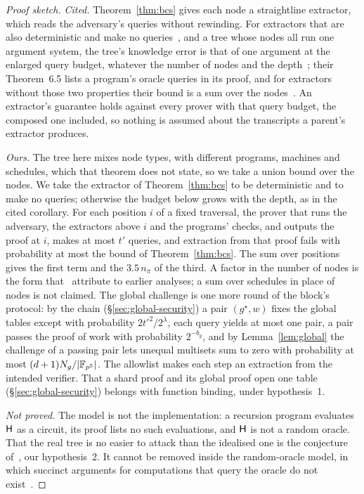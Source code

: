 \begin{proof}[Proof sketch]
\emph{Cited.} Theorem~\ref{thm:bcs} gives each node a straightline extractor, which reads the adversary's queries without rewinding. For extractors that are also deterministic and make no queries~\citep[Def.~3.6]{cgsy24}, and a tree whose nodes all run one argument system, the tree's knowledge error is that of one argument at the enlarged query budget, whatever the number of nodes and the depth~\citep[Thm.~5.1, Rem.~5.2]{cgsy24}; their Theorem~6.5 lists a program's oracle queries in its proof, and for extractors without those two properties their bound is a sum over the nodes~\citep[Cor.~7.8]{cgsy24}. An extractor's guarantee holds against every prover with that query budget, the composed one included, so nothing is assumed about the transcripts a parent's extractor produces.

\emph{Ours.} The tree here mixes node types, with different programs, machines and schedules, which that theorem does not state, so we take a union bound over the nodes. We take the extractor of Theorem~\ref{thm:bcs} to be deterministic and to make no queries; otherwise the budget below grows with the depth, as in the cited corollary. For each position $i$ of a fixed traversal, the prover that runs the adversary, the extractors above $i$ and the programs' checks, and outputs the proof at $i$, makes at most $t'$ queries, and extraction from that proof fails with probability at most the bound of Theorem~\ref{thm:bcs}. The sum over positions gives the first term and the $3.5\,n_\pi$ of the third. A factor in the number of nodes is the form that~\citep{cgsy24} attribute to earlier analyses; a sum over schedules in place of nodes is not claimed. The global challenge is one more round of the block's protocol: by the chain (\S\ref{sec:global-security}) a pair $(g^\star, w)$ fixes the global tables except with probability $2t'^2/2^{\lambda}$, each query yields at most one pair, a pair passes the proof of work with probability $2^{-b_g}$, and by Lemma~\ref{lem:global} the challenge of a passing pair lets unequal multisets sum to zero with probability at most $(d+1)N_g/|\mathbb{F}_{p^5}|$. The allowlist makes each step an extraction from the intended verifier. That a shard proof and its global proof open one table (\S\ref{sec:global-security}) belongs with function binding, under hypothesis~1.

\emph{Not proved.} The model is not the implementation: a recursion program evaluates $\mathsf{H}$ as a circuit, its proof lists no such evaluations, and $\mathsf{H}$ is not a random oracle. That the real tree is no easier to attack than the idealised one is the conjecture of~\citep[\S2.3]{cgsy24}, our hypothesis~2. It cannot be removed inside the random-oracle model, in which succinct arguments for computations that query the oracle do not exist~\citep{bcg24}.
\end{proof}

